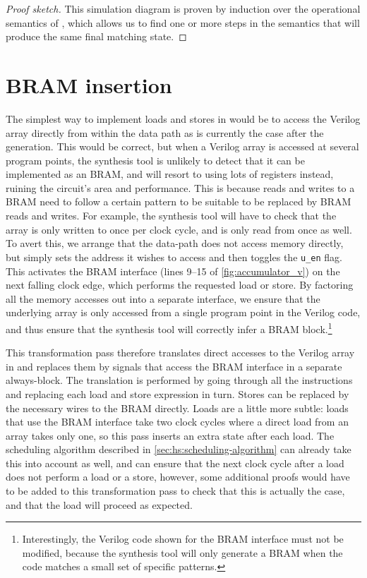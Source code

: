 \begin{proof}[Proof sketch]
  This simulation diagram is proven by induction over the operational semantics
  of \rtlsubpar{}, which allows us to find one or more steps in the \htl{} semantics that
  will produce the same final matching state.
\end{proof}

\section{BRAM insertion}%
\label{sec:hg:bram-insertion}

The simplest way to implement loads and stores in \vericert{} would be to access
the Verilog array directly from within the data path as is currently the case
after the \htl{} generation. This would be correct, but when a Verilog array is
accessed at several program points, the synthesis tool is unlikely to detect
that it can be implemented as an \gls{BRAM}, and will resort to using lots of
registers instead, ruining the circuit's area and performance.  This is because
reads and writes to a \gls{BRAM} need to follow a certain pattern to be suitable
to be replaced by \gls{BRAM} reads and writes.  For example, the synthesis tool
will have to check that the array is only written to once per clock cycle, and
is only read from once as well.  To avert this, we arrange that the data-path
does not access memory directly, but simply sets the address it wishes to access
and then toggles the \texttt{u\_en} flag. This activates the \gls{BRAM}
interface (lines 9--15 of \cref{fig:accumulator_v}) on the next falling clock
edge, which performs the requested load or store. By factoring all the memory
accesses out into a separate interface, we ensure that the underlying array is
only accessed from a single program point in the Verilog code, and thus ensure
that the synthesis tool will correctly infer a \gls{BRAM}
block.\footnote{Interestingly, the Verilog code shown for the \gls{BRAM}
  interface must not be modified, because the synthesis tool will only generate
  a \gls{BRAM} when the code matches a small set of specific patterns.}

This transformation pass therefore translates direct accesses to the Verilog
array in \htl{} and replaces them by signals that access the \gls{BRAM} interface in a
separate always-block. The translation is performed by going through all the
instructions and replacing each load and store expression in turn.  Stores can
be replaced by the necessary wires to the \gls{BRAM} directly. Loads are a little more
subtle: loads that use the \gls{BRAM} interface take two clock cycles where a direct
load from an array takes only one, so this pass inserts an extra state after
each load.  The scheduling algorithm described in
\cref{sec:hs:scheduling-algorithm} can already take this into account as well,
and can ensure that the next clock cycle after a load does not perform a load or
a store, however, some additional proofs would have to be added to this
transformation pass to check that this is actually the case, and that the load
will proceed as expected.

